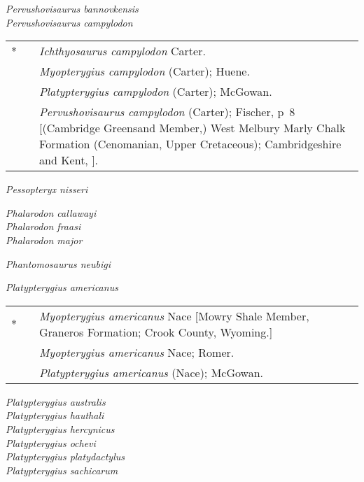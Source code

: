 \documentclass[british,11pt]{article}
\newenvironment*{synonymy}%
	{
		\footnotesize
		\begin{tabu}[l]{rlX}
	}%
	{
		\\
		\end{tabu}
		\normalsize
	}
\begin{document}
\emph{Pervushovisaurus bannovkensis} \cite*[Arkhangelsky,][]{Arkhangelsky1998a} \\
\emph{Pervushovisaurus campylodon} \parencite*[Carter,][]{Carter1846}\\
\begin{synonymy}
	*	& \cite*{Carter1846}	& \emph{Ichthyosaurus campylodon} Carter. \\
		& \cite*{Huene1922}	& \emph{Myopterygius campylodon} (Carter); Huene. \\
		& \cite*{McGowan1972}	& \emph{Platypterygius campylodon} (Carter); McGowan. \\
		& \cite*{Fischer2016a}	& \emph{Pervushovisaurus campylodon} (Carter); Fischer, p~8 [(Cambridge Greensand Member,) West Melbury Marly Chalk Formation (Cenomanian, Upper Cretaceous); Cambridgeshire and Kent, ].
\end{synonymy}

\emph{Pessopteryx nisseri} \cite*[Wiman,][]{Wiman1910}

\emph{Phalarodon callawayi} \cite*[Schmitz et al.,][]{Schmitz2004}\\
\emph{Phalarodon fraasi} \cite*[Merriam,][]{Merriam1910}\\
\emph{Phalarodon major} \cite*[Huene,][]{Huene1916}

\emph{Phantomosaurus neubigi} \parencite*[Sander,][]{Sander1997}

\emph{Platypterygius americanus} \cite*[Nace,][]{Nace1939}\\
\begin{synonymy}
	*	& \cite*{Nace1939}	& \emph{Myopterygius americanus} Nace [Mowry Shale Member, Graneros Formation; Crook County, Wyoming.] \\
		& \cite*{Romer1968}	& \emph{Myopterygius americanus} Nace; Romer. \\
		& \cite*{McGowan1972}	& \emph{Platypterygius americanus} (Nace); McGowan.
\end{synonymy}
\emph{Platypterygius australis} \parencite*[M’Coy,][]{MCoy1867}\\
\emph{Platypterygius hauthali} \parencite*[Huene,][]{Huene1927}\\
\emph{Platypterygius hercynicus} \cite*[Kuhn,][]{Kuhn1946}\\
\emph{Platypterygius ochevi} \cite*[Arkhangelsky et al.,][]{Arkhangelsky2008}\\
\emph{Platypterygius platydactylus} \parencite*[Broili,][]{Broili1907}\\
\emph{Platypterygius sachicarum} \cite*[Páramo,][]{Paramo1997}
\end{document}

